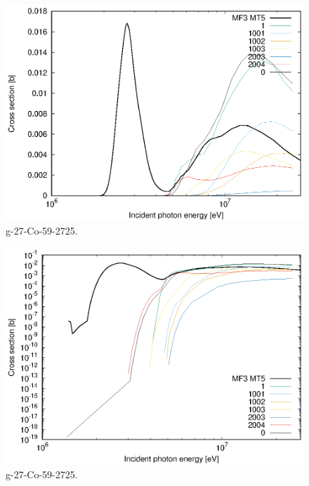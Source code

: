 \begin{figure}
 \includegraphics[width=\linewidth]{eps/g_27-Co-59_2725.eps}
  \caption{g-27-Co-59-2725.}
\end{figure}
\begin{figure}
 \includegraphics[width=\linewidth]{eps-log/g_27-Co-59_2725.eps}
 \caption{g-27-Co-59-2725.}
\end{figure}
\newpage \clearpage

